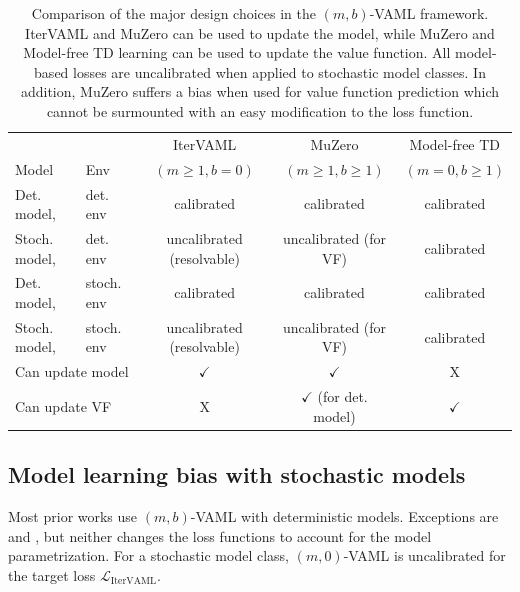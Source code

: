 \begin{table}
    {\footnotesize
    \begin{center}
        \begin{tabular}{l | l|c|c|c}
            && IterVAML &  MuZero &  Model-free TD \\
            Model & Env & {$(m\geq1,b=0)$} &  $(m\geq1,b\geq1)$& $(m=0,b\geq1)$\\\hline
            Det. model,& det. env & {\color{newbluedeal} calibrated} & {\color{newbluedeal} calibrated} & {\color{newbluedeal} calibrated} \\
            Stoch. model,& det. env & {\color{newgreendeal} uncalibrated (resolvable)} & {\color{uoftred} uncalibrated (for VF)} & {\color{newbluedeal} calibrated}\\
            Det. model,& stoch. env & {\color{newbluedeal} calibrated} & {\color{newbluedeal} calibrated}  & {\color{newbluedeal} calibrated} \\
            Stoch. model,& stoch. env & {\color{newgreendeal} uncalibrated (resolvable)} & {\color{uoftred} uncalibrated (for VF)} & {\color{newbluedeal} calibrated} \\\hline
            \multicolumn{2}{l|}{Can update model} & {\color{newbluedeal} $\checkmark$} & {\color{newbluedeal} $\checkmark$}& \color{uoftred} X \\
            \multicolumn{2}{l|}{Can update VF}   & \color{uoftred} X & {\color{newgreendeal} $\checkmark$ (for det. model)}  & {\color{newbluedeal} $\checkmark$}
        \end{tabular}
    \end{center}
    }
    \caption{Comparison of the major design choices in the $(m,b)$-VAML framework. IterVAML and MuZero can be used to update the model, while MuZero and Model-free TD learning can be used to update the value function. All model-based losses are uncalibrated when applied to stochastic model classes. In addition, MuZero suffers a bias when used for value function prediction which cannot be surmounted with an easy modification to the loss function.}
    \label{tab:cvaml:bias_overview}
\end{table}

\subsection{Model learning bias with stochastic models}

Most prior works use $(m,b)$-VAML with deterministic models.
Exceptions are \textcite{voelcker2022value} and \textcite{antonoglou2022planning}, but neither changes the loss functions to account for the model parametrization.
For a stochastic model class, $(m,0)$-VAML is uncalibrated for the target loss $\mathcal{L}_\mathrm{IterVAML}$.

